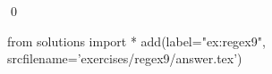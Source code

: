 
\begin{ex} 
  \label{ex:regex9}
  
  \qed
\end{ex} 
\begin{python0}
from solutions import *
add(label="ex:regex9",
    srcfilename='exercises/regex9/answer.tex') 
\end{python0}
